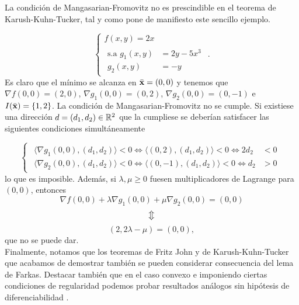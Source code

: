 La condición de Mangasarian-Fromovitz no es prescindible en el teorema de Karush-Kuhn-Tucker, tal y como pone de manifiesto este sencillo ejemplo.

\begin{equation*}
\begin{cases}
f(x,y) = 2x\\
\begin{split}
\text{s.a } g_1(x,y) &= 2y-5x^3\\
g_2(x,y) &= -y
\end{split}
\end{cases}.
\end{equation*}
Es claro que el mínimo se alcanza en $ \bar{\mathbf{x}} = (0,0) $ y tenemos que $ \nabla f(0,0) = (2,0) $, $ \nabla g_1(0,0) = (0,2) $, $ \nabla g_2(0,0) = (0,-1) $ e $ I(\bar{\mathbf{x}}) = \{1,2\} $. La condición de Mangasarian-Fromovitz no se cumple. Si existiese una dirección $ d = (d_1, d_2) \in \mathbb{R}^2 $ que la cumpliese se deberían satisfacer las siguientes condiciones simultáneamente

\begin{equation*}
\begin{cases}
\begin{split}
\langle \nabla g_1(0,0),(d_1, d_2) \rangle < 0 \Longleftrightarrow  \langle (0,2),(d_1, d_2) \rangle < 0 \Longleftrightarrow 2d_2 &< 0\\
\langle \nabla g_2(0,0),(d_1, d_2) \rangle < 0 \Longleftrightarrow \langle (0,-1),(d_1, d_2) \rangle < 0 \Longleftrightarrow d_2 &> 0
\end{split}
\end{cases} 
\end{equation*}
lo que es imposible. Además, si $ \lambda, \mu \geq 0$ fuesen multiplicadores de Lagrange para $ (0,0) $, entonces 
\[
\nabla f(0,0) + \lambda \nabla g_1(0,0) + \mu \nabla g_2(0,0) = (0,0)
\]
\[
\big\Updownarrow
\]
\[
(2,2\lambda - \mu) = (0,0),
\]
que no se puede dar. \\

Finalmente, notamos que los teoremas de Fritz John y de Karush-Kuhn-Tucker que acabamos de demostrar también se pueden considerar consecuencia del lema de Farkas. Destacar también que en el caso convexo e imponiendo ciertas condiciones de regularidad podemos probar resultados análogos sin hipótesis de diferenciabilidad \cite{borwein}.